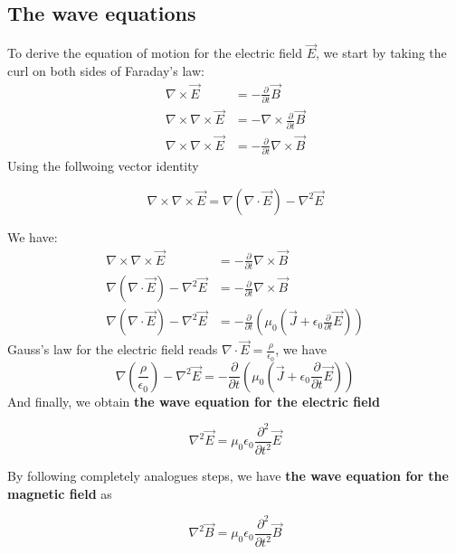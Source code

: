 \subsection{The wave equations}
To derive the equation of motion for the electric field $\overrightarrow{E}$, we start by taking the curl on both sides of Faraday's law:
$$
\begin{aligned}
\nabla \times \vec{E} &=-\frac{\partial}{\partial t} \vec{B} \\
\nabla \times \nabla \times \vec{E} &=-\nabla \times \frac{\partial}{\partial t} \vec{B} \\
\nabla \times \nabla \times \vec{E} &=-\frac{\partial}{\partial t} \nabla \times \vec{B}
\end{aligned}
$$
Using the follwoing vector identity
\begin{qt}
\begin{equation}
\nabla \times \nabla \times \vec{E}=\nabla(\nabla \cdot \vec{E})-\nabla^{2} \vec{E}
\end{equation}
\end{qt}
We have:
$$
\begin{aligned}
\nabla \times \nabla \times \vec{E} &=-\frac{\partial}{\partial t} \nabla \times \vec{B} \\
\nabla(\nabla \cdot \vec{E})-\nabla^{2} \vec{E} &=-\frac{\partial}{\partial t} \nabla \times \vec{B} \\
\nabla(\nabla \cdot \vec{E})-\nabla^{2} \vec{E} &=-\frac{\partial}{\partial t}\left(\mu_{0}\left(\vec{J}+\epsilon_{0} \frac{\partial}{\partial t} \vec{E}\right)\right)
\end{aligned}
$$
Gauss's law for the electric field reads $\nabla \cdot \vec{E}=\frac{\rho}{\epsilon_{0}}$, we have
$$
\nabla\left(\frac{\rho}{\epsilon_{0}}\right)-\nabla^{2} \vec{E}=-\frac{\partial}{\partial t}\left(\mu_{0}\left(\vec{J}+\epsilon_{0} \frac{\partial}{\partial t} \vec{E}\right)\right)
$$
And finally, we obtain \textbf{the wave equation for the electric field}
\begin{qt}
\begin{equation}
\nabla^{2} \vec{E}=\mu_{0} \epsilon_{0} \frac{\partial^{2}}{\partial t^{2}} \vec{E}
\label{waveEqElectric}
\end{equation}
\end{qt}
By following completely analogues steps, we have
\textbf{the wave equation for the magnetic field} as
\begin{qt}
\begin{equation}
\nabla^{2} \vec{B}=\mu_{0} \epsilon_{0} \frac{\partial^{2}}{\partial t^{2}} \vec{B}
\end{equation}
\end{qt}

